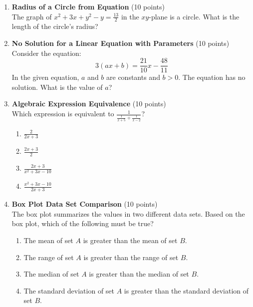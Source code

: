 \begin{enumerate}
  \item \textbf{Radius of a Circle from Equation} (10 points)\\
  The graph of $x^2 + 3x + y^2 - y = \frac{13}{2}$ in the $xy$-plane is a circle. What is the length of the circle's radius?
  \begin{subanswer}
  \end{subanswer}



  \item \textbf{No Solution for a Linear Equation with Parameters} (10 points)\\
  Consider the equation:
  \[
    3(a x + b) = \frac{21}{10}x - \frac{48}{11}
  \]
  In the given equation, $a$ and $b$ are constants and $b > 0$. The equation has no solution. What is the value of $a$?
  \begin{subanswer}
  \end{subanswer}



  \item \textbf{Algebraic Expression Equivalence} (10 points)\\
  Which expression is equivalent to $\frac{1}{\frac{1}{x+5} + \frac{1}{x-2}}$?
  \begin{enumerate}[label=(\Alph*)]
    \item $\frac{2}{2x+3}$
    \item $\frac{2x+3}{2}$
    \item $\frac{2x+3}{x^2+3x-10}$
    \item $\frac{x^2+3x-10}{2x+3}$
  \end{enumerate}
  \begin{subanswer}
  \end{subanswer}



  \item \textbf{Box Plot Data Set Comparison} (10 points)\\
  The box plot summarizes the values in two different data sets. Based on the box plot, which of the following must be true?
  \begin{enumerate}[label=(\Alph*)]
    \item The mean of set $A$ is greater than the mean of set $B$.
    \item The range of set $A$ is greater than the range of set $B$.
    \item The median of set $A$ is greater than the median of set $B$.
    \item The standard deviation of set $A$ is greater than the standard deviation of set $B$.
  \end{enumerate}
  \begin{subanswer}
  \end{subanswer}



\end{enumerate}
